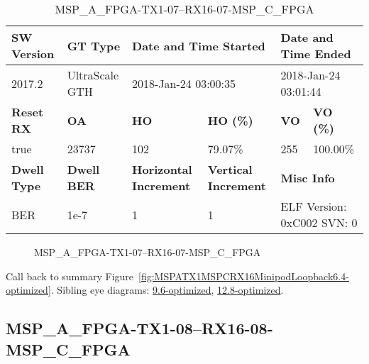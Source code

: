 \begin{table}[h]
\centering
\caption{MSP\_A\_FPGA-TX1-07--RX16-07-MSP\_C\_FPGA}
\label{tab:MSPAFPGATX107RX1607MSPCFPGA6.4-optimized}
\begin{tabular}{@{}|l|l|l|l|l|l|@{}}
\toprule
\textbf{SW Version}                & \textbf{GT Type}   & \multicolumn{2}{l|}{\textbf{Date and Time Started}}            & \multicolumn{2}{l|}{\textbf{Date and Time Ended}}        \\ \midrule
2017.2                       & UltraScale GTH          & \multicolumn{2}{l|}{2018-Jan-24 03:00:35}                   & \multicolumn{2}{l|}{2018-Jan-24 03:01:44}               \\ \midrule
\textbf{Reset RX}                  & \textbf{OA} & \textbf{HO}   & \textbf{HO (\%)} & \textbf{VO} & \textbf{VO (\%)} \\ \midrule
true & 23737        & 102          & 79.07\%        & 255        & 100.00\%       \\ \midrule
\textbf{Dwell Type}                & \textbf{Dwell BER} & \textbf{Horizontal Increment} & \textbf{Vertical Increment}    & \multicolumn{2}{l|}{\textbf{Misc Info}}                  \\ \midrule
BER                            & 1e-7        & 1        & 1           & \multicolumn{2}{l|}{ELF Version: 0xC002 SVN: 0}                         \\ \bottomrule
\end{tabular}
\end{table}

\begin{figure}[h]
\caption{MSP\_A\_FPGA-TX1-07--RX16-07-MSP\_C\_FPGA} \label{fig:MSPAFPGATX107RX1607MSPCFPGA6.4-optimized}
\end{figure}

Call back to summary Figure~\ref{fig:MSPATX1MSPCRX16MinipodLoopback6.4-optimized}.
Sibling eye diagrams: \hyperref[sec:MSPAFPGATX107RX1607MSPCFPGA9.6-optimized]{9.6-optimized}, \hyperref[sec:MSPAFPGATX107RX1607MSPCFPGA12.8-optimized]{12.8-optimized}.

\clearpage
\newpage


\subsection{MSP\_A\_FPGA-TX1-08--RX16-08-MSP\_C\_FPGA}\label{sec:MSPAFPGATX108RX1608MSPCFPGA6.4-optimized}

